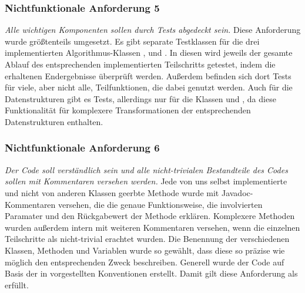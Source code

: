 \subsubsection{Nichtfunktionale Anforderung 5}
\textit{Alle wichtigen Komponenten sollen durch Tests abgedeckt sein.} Diese Anforderung wurde größtenteils umgesetzt. Es gibt separate Testklassen für
die drei implementierten Algorithmus-Klassen ,  und . In diesen wird jeweils der gesamte Ablauf
des entsprechenden implementierten Teilschritts getestet, indem die erhaltenen Endergebnisse überprüft werden. Außerdem befinden sich dort Tests für
viele, aber nicht alle, Teilfunktionen, die dabei genutzt werden. Auch für die Datenstrukturen gibt es Tests, allerdings nur für die Klassen 
und , da diese Funktionalität für komplexere Transformationen der entsprechenden Datenstrukturen enthalten. %

\subsubsection{Nichtfunktionale Anforderung 6}
\textit{Der Code soll verständlich sein und alle nicht-trivialen Bestandteile des Codes sollen mit Kommentaren versehen werden.} Jede von uns selbst
implementierte und nicht von anderen Klassen geerbte Methode wurde mit Javadoc-Kommentaren versehen, die die genaue Funktionsweise, die involvierten
Paramater und den Rückgabewert der Methode erklären. Komplexere Methoden wurden außerdem intern mit weiteren Kommentaren versehen, wenn die einzelnen
Teilschritte als nicht-trivial erachtet wurden. Die Benennung der verschiedenen Klassen, Methoden und Variablen wurde so gewählt, dass diese so präzise
wie möglich den entsprechenden Zweck beschreiben. Generell wurde der Code auf Basis der in \cite{49_java_conventions} vorgestellten Konventionen erstellt.
Damit gilt diese Anforderung als erfüllt.
